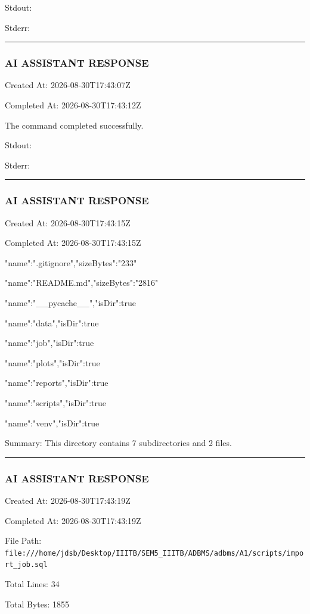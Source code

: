 \documentclass[11pt,a4paper]{article}
\begin{document}
{Stdout:


Stderr:


\hrule

\subsubsection{AI ASSISTANT RESPONSE}

Created At: 2026-08-30T17:43:07Z

Completed At: 2026-08-30T17:43:12Z


The command completed successfully.

Stdout:


Stderr:


\hrule

\subsubsection{AI ASSISTANT RESPONSE}

Created At: 2026-08-30T17:43:15Z

Completed At: 2026-08-30T17:43:15Z

{"name":".gitignore","sizeBytes":"233"}

{"name":"README.md","sizeBytes":"2816"}

{"name":"\_\_pycache\_\_","isDir":true}

{"name":"data","isDir":true}

{"name":"job","isDir":true}

{"name":"plots","isDir":true}

{"name":"reports","isDir":true}

{"name":"scripts","isDir":true}

{"name":"venv","isDir":true}


Summary: This directory contains 7 subdirectories and 2 files.


\hrule

\subsubsection{AI ASSISTANT RESPONSE}

Created At: 2026-08-30T17:43:19Z

Completed At: 2026-08-30T17:43:19Z

File Path: \texttt{file:///home/jdsb/Desktop/IIITB/SEM5\_IIITB/ADBMS/adbms/A1/scripts/import\_job.sql}

Total Lines: 34

Total Bytes: 1855

}
\end{document}
